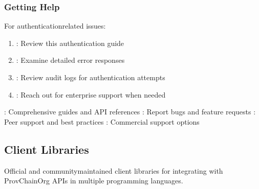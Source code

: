 \documentclass[letterpaper,10pt,english]{sphinxmanual}
\begin{document}
\begin{sphinxVerbatim}[commandchars=\\\{\}]
\end{sphinxVerbatim}


\subsubsection{Getting Help}
\label{\detokenize{api/authentication:getting-help}}
\sphinxAtStartPar
For authentication\sphinxhyphen{}related issues:
\begin{enumerate}
%
\item {} 
\sphinxAtStartPar
{}: Review this authentication guide

\item {} 
\sphinxAtStartPar
{}: Examine detailed error responses

\item {} 
\sphinxAtStartPar
{}: Review audit logs for authentication attempts

\item {} 
\sphinxAtStartPar
{}: Reach out for enterprise support when needed

\end{enumerate}

\sphinxAtStartPar
{}
\sphinxhyphen{} : Comprehensive guides and API references
\sphinxhyphen{} : Report bugs and feature requests
\sphinxhyphen{} : Peer support and best practices
\sphinxhyphen{} : Commercial support options



\sphinxstepscope


\subsection{Client Libraries}
\label{\detokenize{api/client-libraries:client-libraries}}\label{\detokenize{api/client-libraries::doc}}
\sphinxAtStartPar
Official and community\sphinxhyphen{}maintained client libraries for integrating with ProvChainOrg APIs in multiple programming languages.
\end{document}
